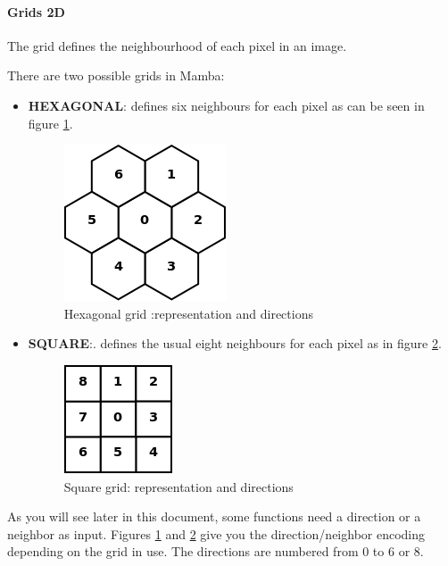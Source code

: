 \documentclass[a4paper,10pt,oneside]{article}
\begin{document}
\paragraph{Grids 2D}

The grid defines the neighbourhood of each pixel in an image.

There are two possible grids in Mamba:

\begin{itemize}
\item \textbf{HEXAGONAL}: defines six neighbours for each pixel as can be seen in 
figure \ref{fig:hxgriddir}.

\begin{figure}
\centering
\includegraphics[scale=0.3]{figures/hxGriddir.png}
\caption{Hexagonal grid :representation and directions}
\label{fig:hxgriddir}
\end{figure}

\item \textbf{SQUARE}:. defines the usual eight neighbours for each pixel as
in figure \ref{fig:sqgriddir}.

\begin{figure}
\centering
\includegraphics[scale=0.4]{figures/sqGriddir.png}
\caption{Square grid: representation and directions}
\label{fig:sqgriddir}
\end{figure}

\end{itemize}

As you will see later in this document, some functions need a direction or a 
neighbor as input. Figures \ref{fig:hxgriddir} and \ref{fig:sqgriddir} give you
the direction/neighbor encoding depending on the grid in use. The directions
are numbered from 0 to 6 or 8.
\end{document}
